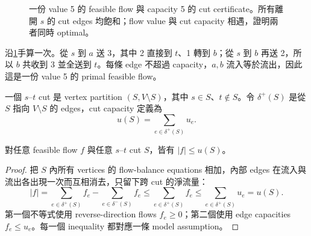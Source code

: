 \documentclass[11pt,a4paper,oneside,openany]{book}
\begin{document}
\begin{figure}[htbp]
\centering
{}
\caption{一份 value 5 的 feasible flow 與 capacity 5 的 cut certificate。所有離開 $s$ 的 cut edges 均飽和；flow value 與 cut capacity 相遇，證明兩者同時 optimal。}
\label{fig:maxflow-cut-certificate}
\end{figure}

沿\cref{fig:maxflow-cut-certificate}手算一次。從 $s$ 到 $a$ 送 3，其中 2 直接到 $t$、1 轉到 $b$；從 $s$ 到 $b$ 再送 2，所以 $b$ 共收到 3 並全送到 $t$。每條 edge 不超過 capacity，$a,b$ 流入等於流出，因此這是一份 value 5 的 primal feasible flow。

\begin{definition}
一個 $s$--$t$ cut 是 vertex partition $(S,V\setminus S)$，其中 $s\in S$、$t\notin S$。令 $\delta^+(S)$ 是從 $S$ 指向 $V\setminus S$ 的 edges，cut capacity 定義為
\[
 u(S)=\sum_{e\in\delta^+(S)}u_e.
\]
\end{definition}

\begin{theorem}
對任意 feasible flow $f$ 與任意 $s$--$t$ cut $S$，皆有 $|f|\le u(S)$。
\end{theorem}
\begin{proof}
把 $S$ 內所有 vertices 的 flow-balance equations 相加，內部 edges 在流入與流出各出現一次而互相消去，只留下跨 cut 的淨流量：
\[
 |f|
 =\sum_{e\in\delta^+(S)}f_e
  -\sum_{e\in\delta^-(S)}f_e
 \le\sum_{e\in\delta^+(S)}f_e
 \le\sum_{e\in\delta^+(S)}u_e=u(S).
\]
第一個不等式使用 reverse-direction flows $f_e\ge0$；第二個使用 edge capacities $f_e\le u_e$。每一個 inequality 都對應一條 model assumption。
\end{proof}
\end{document}
